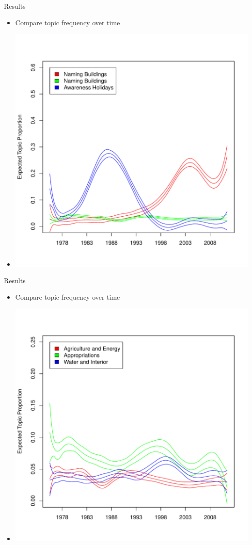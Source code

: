 \documentclass[12pt]{beamer}
\begin{document}
\begin{frame}{Results}
	\begin{itemize}
	\item Compare topic frequency over time 
	\item \includegraphics[scale=.4]{effect1.pdf}
	\end{itemize}
\end{frame}
	
\begin{frame}{Results}
	\begin{itemize}
	\item Compare topic frequency over time 
	\item \includegraphics[scale=.4]{effect2.pdf}
	\end{itemize}
\end{frame}
\end{document}
